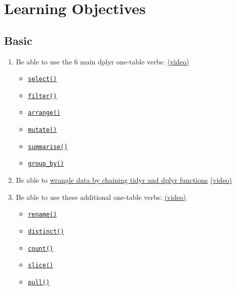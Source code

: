 \documentclass[
  oneside]{book}
\providecommand{\tightlist}{%
  \setlength{\itemsep}{0pt}\setlength{\parskip}{0pt}}
\begin{document}
\hypertarget{ilo-dplyr}{%
\section{Learning Objectives}\label{ilo-dplyr}}

\hypertarget{basic-3}{%
\subsection*{Basic}\label{basic-3}}

\begin{enumerate}
\def\labelenumi{\arabic{enumi}.}
\tightlist
\item
  Be able to use the 6 main dplyr one-table verbs: \href{https://youtu.be/l12tNKClTR0}{(video)}

  \begin{itemize}
  \tightlist
  \item
    \protect\hyperlink{select}{\texttt{select()}}
  \item
    \protect\hyperlink{filter}{\texttt{filter()}}
  \item
    \protect\hyperlink{arrange}{\texttt{arrange()}}
  \item
    \protect\hyperlink{mutate}{\texttt{mutate()}}
  \item
    \protect\hyperlink{summarise}{\texttt{summarise()}}
  \item
    \protect\hyperlink{group_by}{\texttt{group\_by()}}
  \end{itemize}
\item
  Be able to \protect\hyperlink{all-together}{wrangle data by chaining tidyr and dplyr functions} \href{https://youtu.be/hzFFAkwrkqA}{(video)}
\item
  Be able to use these additional one-table verbs: \href{https://youtu.be/GmfF162mq4g}{(video)}

  \begin{itemize}
  \tightlist
  \item
    \protect\hyperlink{rename}{\texttt{rename()}}
  \item
    \protect\hyperlink{distinct}{\texttt{distinct()}}
  \item
    \protect\hyperlink{count}{\texttt{count()}}
  \item
    \protect\hyperlink{slice}{\texttt{slice()}}
  \item
    \protect\hyperlink{pull}{\texttt{pull()}}
  \end{itemize}
\end{enumerate}
\end{document}

